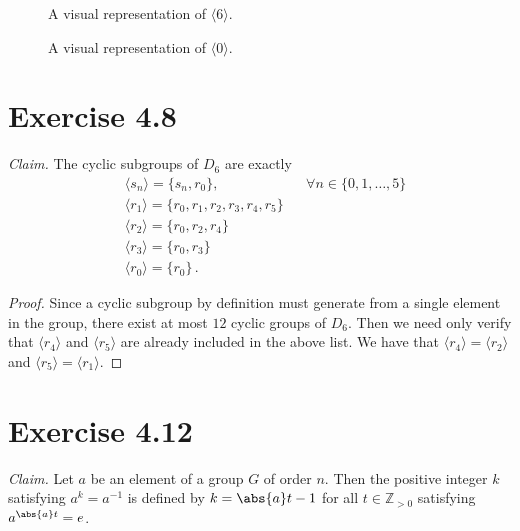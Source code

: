\documentclass{abrice}
\newcommand{\Z}{\mathbb{Z}}
\begin{document}
\begin{figure}[htb]
  \centering
  \caption{A visual representation of $\langle 6 \rangle$.}
  \label{fig:4.8e}
\end{figure}

\begin{figure}[htb]
  \centering
  \caption{A visual representation of $\langle 0 \rangle$.}
  \label{fig:4.8b}
\end{figure}

\clearpage

\section{Exercise 4.8}
\textit{Claim.} The cyclic subgroups of $D_6$ are exactly
\begin{align*}
  & \langle s_n \rangle = \{ s_n, r_0 \}, && \forall n \in \{0,1,\ldots,5\} \\
  & \langle r_1 \rangle = \{ r_0, r_1, r_2, r_3, r_4, r_5 \} \\
  & \langle r_2 \rangle = \{ r_0, r_2, r_4 \} \\
  & \langle r_3 \rangle = \{ r_0, r_3 \} \\
  & \langle r_0 \rangle = \{ r_0 \} \, .
\end{align*}

\begin{proof}
  Since a cyclic subgroup by definition must generate from a single element in
  the group, there exist at most $12$ cyclic groups of $D_6$. Then we need only
  verify that $\langle r_4 \rangle$ and $\langle r_5 \rangle$ are already
  included in the above list. We have that $\langle r_4 \rangle = \langle r_2
  \rangle$ and $\langle r_5 \rangle = \langle r_1 \rangle$.
\end{proof}

\section{Exercise 4.12}
\emph{Claim.} Let $a$ be an element of a group $G$ of order $n$. Then the
positive integer $k$ satisfying $a^k = a^{-1}$ is defined by $k = \abs{a}t - 1$
for all $t \in \Z_{> 0}$ satisfying $a^{\abs{a}t} = e$.
\end{document}
